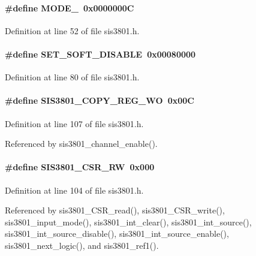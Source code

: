\paragraph[{MODE\_\-3}]{\setlength{\rightskip}{0pt plus 5cm}\#define MODE\_~0x0000000C}\hfill\label{sis3801_8h_aeb99b4257cb3cd9fb539529a1bd2d9ca}


Definition at line 52 of file sis3801.h.
\paragraph[{SET\_\-SOFT\_\-DISABLE}]{\setlength{\rightskip}{0pt plus 5cm}\#define SET\_\-SOFT\_\-DISABLE~0x00080000}\hfill\label{sis3801_8h_a73c38dfbc5fbf7d0349e817608f738fb}


Definition at line 80 of file sis3801.h.
\paragraph[{SIS3801\_\-COPY\_\-REG\_\-WO}]{\setlength{\rightskip}{0pt plus 5cm}\#define SIS3801\_\-COPY\_\-REG\_\-WO~0x00C}\hfill\label{sis3801_8h_a461c280dd2dd48ae3560c28cf8dca7fa}


Definition at line 107 of file sis3801.h.

Referenced by sis3801\_\-channel\_\-enable().
\paragraph[{SIS3801\_\-CSR\_\-RW}]{\setlength{\rightskip}{0pt plus 5cm}\#define SIS3801\_\-CSR\_\-RW~0x000}\hfill\label{sis3801_8h_a0d9982fe76e2f1caed964186a2d3007f}


Definition at line 104 of file sis3801.h.

Referenced by sis3801\_\-CSR\_\-read(), sis3801\_\-CSR\_\-write(), sis3801\_\-input\_\-mode(), sis3801\_\-int\_\-clear(), sis3801\_\-int\_\-source(), sis3801\_\-int\_\-source\_\-disable(), sis3801\_\-int\_\-source\_\-enable(), sis3801\_\-next\_\-logic(), and sis3801\_\-ref1().
